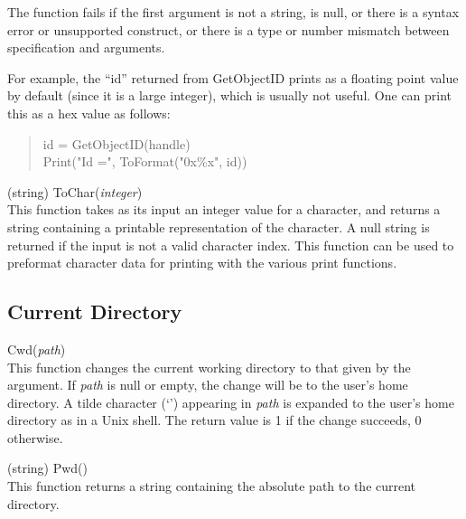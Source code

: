 \begin{description}
The function fails if the first argument is not a string, is null, or
there is a syntax error or unsupported construct, or there is a type
or number mismatch between specification and arguments.

For example, the ``id'' returned from {\vt GetObjectID} prints as a
floating point value by default (since it is a large integer), which
is usually not useful.  One can print this as a hex value as follows:

\begin{quote}\vt
 id = GetObjectID(handle)\\
 Print("Id =", ToFormat("0x\%x", id))
\end{quote}

\item{(string) \vt ToChar({\it integer\/})}\\
This function takes as its input an integer value for a character, and
returns a string containing a printable representation of the
character.  A null string is returned if the input is not a valid
character index.  This function can be used to preformat character
data for printing with the various print functions.

\end{description}


\subsection{Current Directory}

\begin{description}
\item{\vt Cwd({\it path\/})}\\
This function changes the current working directory to that given by
the argument.  If {\it path\/} is null or empty, the change will be to
the user's home directory.  A tilde character (`')
appearing in {\it path\/} is expanded to the user's home directory as
in a Unix shell.  The return value is 1 if the change succeeds, 0
otherwise.

\item{(string) \vt Pwd()}\\
This function returns a string containing the absolute path to
the current directory.

\end{description}


